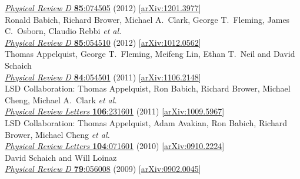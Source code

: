 \begin{spacelist}
\begin{revnumerate}
      \href{https://doi.org/10.1103/PhysRevD.85.074505}{\textit{Physical Review D} \textbf{85}:074505} (2012) [\href{http://arxiv.org/abs/1201.3977}{arXiv:1201.3977}]
    \pagebreakitem
       \\
      Ronald Babich, Richard Brower, Michael A.~Clark, George T.~Fleming, James C.~Osborn, Claudio Rebbi \textit{et al.} \\ %
      \href{https://doi.org/10.1103/PhysRevD.85.054510}{\textit{Physical Review D} \textbf{85}:054510} (2012) [\href{http://arxiv.org/abs/1012.0562}{arXiv:1012.0562}]
    \pagebreakitem
       \\
      Thomas Appelquist, George T.~Fleming, Meifeng Lin, Ethan T.~Neil and David Schaich \\
      \href{https://doi.org/10.1103/PhysRevD.84.054501}{\textit{Physical Review D} \textbf{84}:054501} (2011) [\href{http://arxiv.org/abs/1106.2148}{arXiv:1106.2148}]
    \pagebreakitem
       \\
      LSD Collaboration: Thomas Appelquist, Ron Babich, Richard Brower, Michael Cheng, Michael A.~Clark \textit{et al.} \\ %
      \href{https://doi.org/10.1103/PhysRevLett.106.231601}{\textit{Physical Review Letters} \textbf{106}:231601} (2011) [\href{http://arxiv.org/abs/1009.5967}{arXiv:1009.5967}]
    \pagebreakitem
       \\
      LSD Collaboration: Thomas Appelquist, Adam Avakian, Ron Babich, Richard Brower, Michael Cheng \textit{et al.} \\ %
      \href{https://doi.org/10.1103/PhysRevLett.104.071601}{\textit{Physical Review Letters} \textbf{104}:071601} (2010) [\href{http://arxiv.org/abs/0910.2224}{arXiv:0910.2224}]
    \pagebreakitem
       \\
      David Schaich and Will Loinaz \\
      \href{https://doi.org/10.1103/PhysRevD.79.056008}{\textit{Physical Review D} \textbf{79}:056008} (2009) [\href{http://arxiv.org/abs/0902.0045}{arXiv:0902.0045}] \\

\end{revnumerate}
\end{spacelist}
